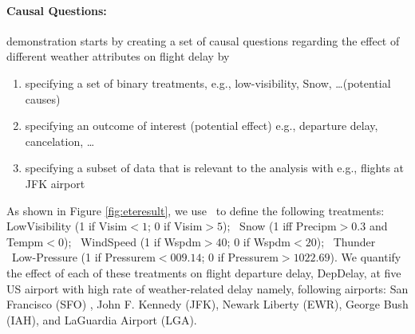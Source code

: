 


  \paragraph{\bf Causal Questions:} demonstration starts by creating a set of causal questions regarding the effect of different weather attributes on flight delay by
    \begin{enumerate}
      \item specifying a set of binary treatments, e.g., low-visibility, Snow, \ldots (potential causes)
      \item specifying an outcome of interest (potential effect) e.g., departure delay, cancelation, \ldots
      \item specifying a subset of data that is relevant to the analysis with e.g., flights at JFK airport
\end{enumerate}

 As shown in Figure \ref{fig:eteresult}, we use \GSQL\ to define the following treatments:
 LowVisibility (1 if Visim$<1$; 0 if Visim$>5$); \
Snow (1 iff Precipm$>0.3$ and Tempm$<0$); \ WindSpeed (1 if
Wspdm$>40$; 0 if Wspdm$<20$); \  Thunder \ Low-Pressure (1 if Pressurem$<009.14$; 0 if Pressurem$>1022.69$). We quantify the effect of each of these treatments on flight departure delay, DepDelay, at five US airport with high rate of weather-related delay namely,
 following airports: San Francisco (SFO) , John F. Kennedy (JFK), Newark Liberty (EWR), George Bush (IAH), and LaGuardia Airport (LGA).

